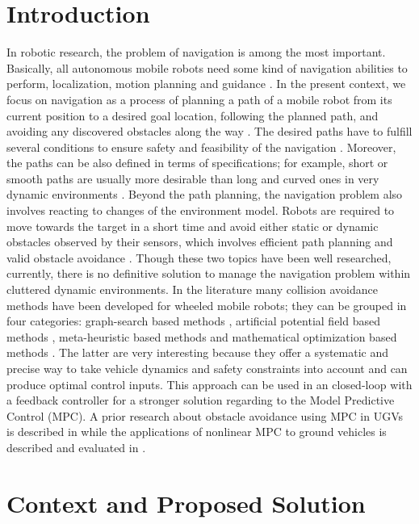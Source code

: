 \documentclass[conference,11pt]{IEEEtran}
\begin{document}
\section{Introduction}
In robotic research, the problem of navigation is among the most important. Basically, all autonomous mobile robots need some kind of navigation abilities to perform, localization, motion planning and guidance \cite{skoda}.
In the present context, we focus on navigation as a process of planning a path of a mobile robot from its current position to a desired goal location, following the planned path, and avoiding any discovered obstacles along the way \cite{fuzzyMPC} \cite{NONMPC}. The desired paths have to fulfill several conditions to ensure safety and feasibility of the navigation \cite{safety}. Moreover, the paths can be also defined in terms of specifications; for example, short or smooth paths are usually more desirable than long and curved ones in very dynamic environments \cite{archi}. Beyond the path planning, the navigation problem also involves reacting to changes of the environment model. Robots are required to move towards the target in a short time and avoid either static or dynamic obstacles observed by their sensors, which involves efficient path planning and valid obstacle avoidance \cite{MMPC} \cite{autoMPC}. Though these two topics have been well researched, currently, there is no definitive solution to manage the navigation problem within cluttered dynamic environments. In the literature many collision avoidance methods have been developed for wheeled mobile robots; they can be grouped in four categories: graph-search based methods \cite{RRT}, artificial potential field based methods \cite{potential}, meta-heuristic based methods \cite{meta-heuristic} and mathematical optimization based methods \cite{borelli2}.
The latter are very interesting because they offer a systematic and precise way to take vehicle dynamics and safety constraints into account and can produce optimal control inputs. This approach can be used in an closed-loop with a feedback controller for a stronger solution regarding to the Model Predictive Control (MPC). A prior research about obstacle avoidance using MPC in UGVs is described in \cite{borelli} while the applications of nonlinear MPC to ground vehicles is described and evaluated in \cite{nonlinearmpc}.
\section{Context and Proposed Solution}
\end{document}

